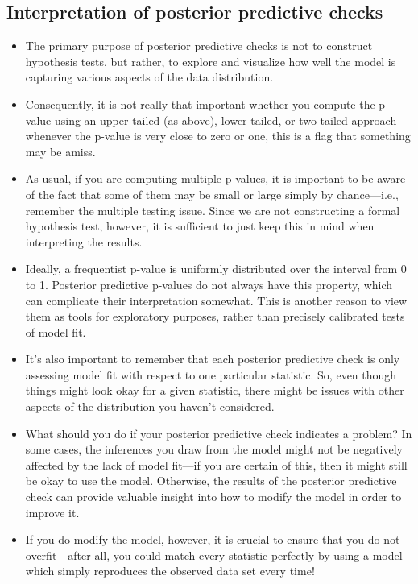 \documentclass[12pt]{article}
\begin{document}
\subsection*{Interpretation of posterior predictive checks}
\begin{itemize}
\item The primary purpose of posterior predictive checks is not to construct hypothesis tests, but rather, to explore and visualize how well the model is capturing various aspects of the data distribution.
\item Consequently, it is not really that important whether you compute the p-value using an upper tailed (as above), lower tailed, or two-tailed approach---whenever the p-value is very close to zero or one, this is a flag that something may be amiss.
\item As usual, if you are computing multiple p-values, it is important to be aware of the fact that some of them may be small or large simply by chance---i.e., remember the multiple testing issue. Since we are not constructing a formal hypothesis test, however, it is sufficient to just keep this in mind when interpreting the results.
\item Ideally, a frequentist p-value is uniformly distributed over the interval from 0 to 1. Posterior predictive p-values do not always have this property, which can complicate their interpretation somewhat. This is another reason to view them as tools for exploratory purposes, rather than precisely calibrated tests of model fit.
\item It's also important to remember that each posterior predictive check is only assessing model fit with respect to one particular statistic. So, even though things might look okay for a given statistic, there might be issues with other aspects of the distribution you haven't considered.
\item What should you do if your posterior predictive check indicates a problem? In some cases, the inferences you draw from the model might not be negatively affected by the lack of model fit---if you are certain of this, then it might still be okay to use the model. Otherwise, the results of the posterior predictive check can provide valuable insight into how to modify the model in order to improve it. 
\item If you do modify the model, however, it is crucial to ensure that you do not overfit---after all, you could match every statistic perfectly by using a model which simply reproduces the observed data set every time!
\end{itemize}
\end{document}

